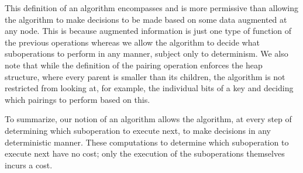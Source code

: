 This definition of an algorithm encompasses and is more permissive than allowing the algorithm to make decisions to be made based on some data augmented at any node. This is because augmented information is just one type of function of the previous operations whereas we allow the algorithm to decide what suboperations to perform in any manner, subject only to determinism. We also note that while the definition of the pairing operation enforces the heap structure, where every parent is smaller than its children, the algorithm is not restricted from looking at, for example, the individual bits of a key and deciding which pairings to perform based on this. 

\begin{fullonly}
To summarize, our notion of an algorithm allows the algorithm, at every step of determining which suboperation to execute next, to make decisions in any deterministic manner. These computations to determine which suboperation to execute next have no cost; only the execution of the suboperations themselves incurs a cost.
\end{fullonly}

